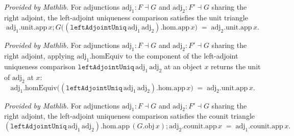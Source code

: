 \begin{lemma}
  \label{lem:unit_leftadjointuniq_hom_app}
  \mathlibok
  \textit{Provided by Mathlib.}
  For adjunctions \(\mathrm{adj}_1 : F \dashv G\) and \(\mathrm{adj}_2 : F' \dashv G\) sharing the
  right adjoint, the left-adjoint uniqueness comparison satisfies the unit triangle
  \[
    \mathrm{adj}_1.\mathrm{unit}.\mathrm{app}\,x
      \mathbin{;} G\bigl((\mathtt{leftAdjointUniq}\,\mathrm{adj}_1\,\mathrm{adj}_2).\mathrm{hom}.\mathrm{app}\,x\bigr)
      \;=\; \mathrm{adj}_2.\mathrm{unit}.\mathrm{app}\,x.
  \]
\end{lemma}

\begin{lemma}
  \label{lem:homequiv_leftadjointuniq_hom_app}
  \mathlibok
  \textit{Provided by Mathlib.}
  For adjunctions \(\mathrm{adj}_1 : F \dashv G\) and \(\mathrm{adj}_2 : F' \dashv G\) sharing the
  right adjoint, applying \(\mathrm{adj}_1.\mathrm{homEquiv}\) to the component of the left-adjoint
  uniqueness comparison \(\mathtt{leftAdjointUniq}\,\mathrm{adj}_1\,\mathrm{adj}_2\) at an object
  \(x\) returns the unit of \(\mathrm{adj}_2\) at \(x\):
  \[
    \mathrm{adj}_1.\mathrm{homEquiv}\bigl(
      (\mathtt{leftAdjointUniq}\,\mathrm{adj}_1\,\mathrm{adj}_2).\mathrm{hom}.\mathrm{app}\,x\bigr)
      \;=\; \mathrm{adj}_2.\mathrm{unit}.\mathrm{app}\,x.
  \]
\end{lemma}

\begin{lemma}
  \label{lem:leftadjointuniq_hom_app_counit}
  \mathlibok
  \textit{Provided by Mathlib.}
  For adjunctions \(\mathrm{adj}_1 : F \dashv G\) and \(\mathrm{adj}_2 : F' \dashv G\) sharing the
  right adjoint, the left-adjoint uniqueness comparison satisfies the counit triangle
  \[
    (\mathtt{leftAdjointUniq}\,\mathrm{adj}_1\,\mathrm{adj}_2).\mathrm{hom}.\mathrm{app}\,(G.\mathrm{obj}\,x)
      \mathbin{;} \mathrm{adj}_2.\mathrm{counit}.\mathrm{app}\,x
      \;=\; \mathrm{adj}_1.\mathrm{counit}.\mathrm{app}\,x.
  \]
\end{lemma}

